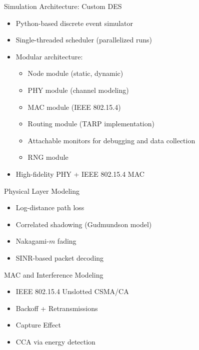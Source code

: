 \documentclass{beamer}
\begin{document}

\begin{frame}{Simulation Architecture: Custom DES}
  \begin{itemize}
    \item Python-based discrete event simulator
    \item Single-threaded scheduler (parallelized runs)
    \item Modular architecture:
      \begin{itemize}
        \item Node module (static, dynamic)
        \item PHY module (channel modeling)
        \item MAC module (IEEE 802.15.4)
        \item Routing module (TARP implementation)
        \item Attachable monitors for debugging and data collection
        \item RNG module
      \end{itemize}
    \item High-fidelity PHY + IEEE 802.15.4 MAC
  \end{itemize}
\end{frame}


\begin{frame}{Physical Layer Modeling}
  \begin{itemize}
    \item Log-distance path loss
    \item Correlated shadowing (Gudmundson model)
    \item Nakagami-$m$ fading
    \item SINR-based packet decoding
  \end{itemize}

  \vspace{0.5cm}
  \centering
\end{frame}


\begin{frame}{MAC and Interference Modeling}
  \begin{itemize}
    \item IEEE 802.15.4 Unslotted CSMA/CA
    \item Backoff + Retransmissions
    \item Capture Effect
    \item CCA via energy detection
  \end{itemize}
\end{frame}
\end{document}
